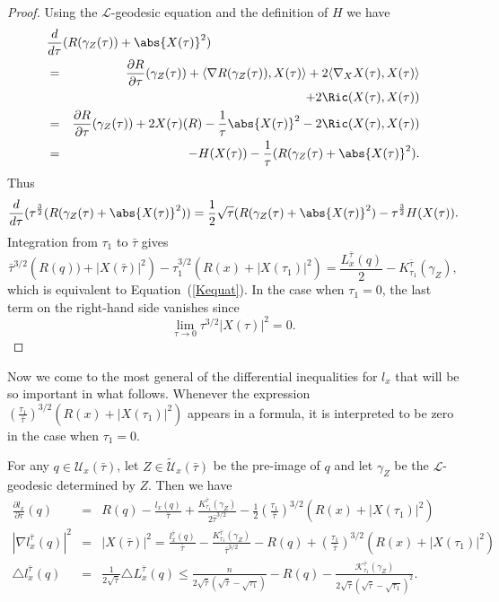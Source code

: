 \begin{proof}
\sketch
{}
Using the ${\mathcal L}$-geodesic equation and the definition of $H$ we have
\begin{eqnarray*}
\lefteqn{\frac{d}{d\tau}(R(\gamma_Z(\tau))+ \abs{X(\tau)}^{2})} \\ &
= & \frac{\partial R}{\partial\tau}(\gamma_Z(\tau)) + \langle \nabla
R(\gamma_Z(\tau)),
X(\tau)\rangle + 2\langle \nabla_{X}X(\tau),X(\tau)\rangle \\
& & + 2\Ric(X(\tau),X(\tau))
\\&= & \frac{\partial R}{\partial\tau}(\gamma_Z(\tau)) + 2X(\tau)(R) - \frac{1}{\tau}\abs{X(\tau)}^{2} -
2\Ric(X(\tau),X(\tau)) \\&= &-H(X(\tau))
-\frac{1}{\tau}(R(\gamma_Z(\tau)+ \abs{X(\tau)}^{2}).
\end{eqnarray*}
Thus
$$\frac{d}{d\tau}(\tau^{\frac{3}{2}}(R(\gamma_Z(\tau)+\abs{X(\tau)}^{2}) )=
\frac{1}{2}\sqrt{\tau}(R(\gamma_Z(\tau)+\abs{X(\tau)}^{2}) -
\tau^{\frac{3}{2}}H(X(\tau)).$$ Integration from $\tau_1$ to $\bar\tau$ gives
$$\bar\tau^{3/2}\left(R(q))+|X(\bar\tau)|^2\right)-\tau_1^{3/2}(R(x)+|X(\tau_1)|^2)
=\frac{L_x^{\bar\tau}(q)}{2}-K_{\tau_1}^{\bar\tau}(\gamma_Z),$$
which is equivalent to Equation~(\ref{Kequat}). In the case when
$\tau_1=0$, the last term on the right-hand side vanishes since
$$\lim_{\tau\rightarrow 0}\tau^{3/2}|X(\tau)|^2=0.$$
\end{proof}



Now we come to the most general of the differential inequalities for
$l_x$ that will be so important in what follows. Whenever the
expression
$\left(\frac{\tau_1}{\bar\tau}\right)^{3/2}\left(R(x)+|X(\tau_1)|^2\right)$
appears in a formula, it is interpreted to be zero in the case when
$\tau_1=0$.


\begin{lemma}\label{lem:reduced-length-differential-inequalities}
\label{linequal}
For any  $q\in{\mathcal U}_x(\bar\tau)$, let $Z\in
\widetilde{\mathcal U}_x(\bar\tau)$ be the pre-image of $q$ and let
$\gamma_Z$ be the ${\mathcal L}$-geodesic determined by $Z$. Then we
have
\begin{eqnarray*} \frac{\partial l_x}{\partial \tau}(q) & = &
R(q)-\frac{l_x(q)}{\bar\tau}+\frac{K_{\tau_1}^{\bar\tau}(\gamma_Z)}{2\bar\tau^{3/2}}-\frac{1}{2}\left(\frac{\tau_1}{\bar\tau}
\right)^{3/2}\left(R(x)+|X(\tau_1)|^2\right) \\
|\nabla l^{\bar\tau}_x(q)|^2 & = & |X(\bar\tau)|^2
=\frac{l^{\bar\tau}_x(q)}{\bar\tau}-\frac{K_{\tau_1}^{\bar\tau}
(\gamma_Z)}{\bar\tau^{3/2}}-R(q) +\left(\frac{\tau_1}{\bar\tau}
\right)^{3/2}\left(R(x)+|X(\tau_1)|^2\right) \\
\triangle l^{\bar\tau}_x(q) & = & \frac{1}{2\sqrt{\bar\tau}}\triangle
L^{\bar\tau}_x(q)\le \frac{n}{2\sqrt{\bar\tau}(\sqrt{\bar\tau}-\sqrt{\tau_1})}
-R(q)-\frac{{\mathcal
K}_{\tau_1}^{\bar\tau}(\gamma_Z)}{2\sqrt{\bar\tau}(\sqrt{\bar\tau}-\sqrt{\tau_1})^{2}}.
\end{eqnarray*}
\end{lemma}

